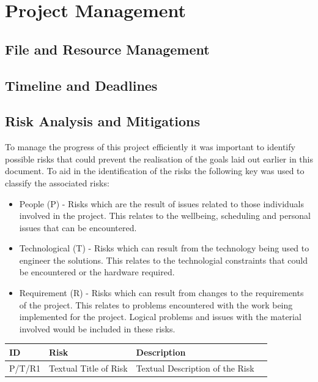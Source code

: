 \documentclass[12pt]{article}  %
\theoremstyle{definition}
\theoremstyle{remark}
\begin{document}
\newpage                     %
\section{Project Management}\label{ss:back}

\subsection {File and Resource Management}

\subsection {Timeline and Deadlines}

\subsection {Risk Analysis and Mitigations}

To manage the progress of this project efficiently it was important to identify possible risks that could prevent the realisation of the goals laid out earlier in this document. To aid in the identification of the risks the following key was used to classify the associated risks:
\begin{itemize}
\item{People (P) - Risks which are the result of issues related to those individuals involved in the project. This relates to the wellbeing, scheduling and personal issues that can be encountered.}
\item{Technological (T) - Risks which can result from the technology being used to engineer the solutions. This relates to the technologial constraints that could be encountered or the hardware required.}
\item{Requirement (R)  - Risks which can result from changes to the requirements of the project. This relates to problems encountered with the work being implemented for the project. Logical problems and issues with the material involved would be included in these risks.}
\end{itemize}

\begin{tabularx}{1.1\textwidth} {
	|  >{\center\arraybackslash}X
	| >{\center\arraybackslash}X
	| >{\center\arraybackslash}X
	| >{\center\arraybackslash} X | }
	\hline
	ID & Risk & Description \\
	\hline
	P/T/R1 & Textual Title of Risk & Textual Description of the Risk \\
	\hline
\end{tabularx}
\end{document}
